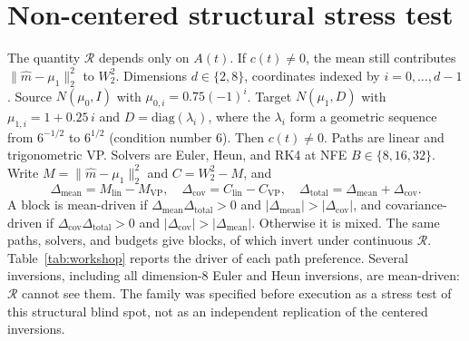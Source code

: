 \documentclass[11pt,a4paper]{article}
\theoremstyle{remark}
\newcommand{\wtwo}{W_2}
\newcommand{\cR}{\mathcal{R}}
\begin{document}
\begin{table}[!htbp]
  \centering
  \caption{Four specified candidate paths on the centered grid. Among
  these four paths, the per-mode schedule has the smallest $\cR$ and the
  smallest $\wtwo$ in $36$ of $36$ tested blocks. This finite enumeration
  does not imply that a global $\cR$-minimizer minimizes fixed-NFE error.
  When $\Sigma_1$ has at least two distinct eigenvalues, that path is not
  a Class~S shared interpolant.}
  \label{tab:logcov}
  \scriptsize
  \setlength{\tabcolsep}{3.5pt}
  
  \vspace{0.6em}
  \caption{Shared-schedule pairwise inversions: trigonometric VP versus
  Chen Example~3.3 with $M=\lambda_{\max}$. Nine of $36$ blocks; four of
  $12$ cells. Post-hoc pairwise census, not a global family optimum.}
  \label{tab:infamily}
  \small
  
\end{table}

\section{Non-centered structural stress test}
\label{app:noncentered}

The quantity $\cR$ depends only on $A(t)$. If $c(t)\ne 0$, the mean still
contributes $\|\hat m-\mu_1\|_2^2$ to $\wtwo^2$. Dimensions $d\in\{2,8\}$,
coordinates indexed by $i=0,\ldots,d-1$. Source $N(\mu_0,I)$ with
$\mu_{0,i}=0.75(-1)^i$. Target $N(\mu_1,D)$ with $\mu_{1,i}=1+0.25\,i$ and
$D=\mathrm{diag}(\lambda_i)$, where the $\lambda_i$ form a geometric
sequence from $6^{-1/2}$ to $6^{1/2}$ (condition number $6$). Then
$c(t)\ne 0$. Paths are linear and trigonometric VP. Solvers are Euler, Heun,
and RK4 at NFE $B\in\{8,16,32\}$. Write $M=\|\hat m-\mu_1\|_2^2$ and
$C=\wtwo^2-M$, and
\begin{equation}
  \Delta_{\mathrm{mean}}=M_{\mathrm{lin}}-M_{\mathrm{VP}},\quad
  \Delta_{\mathrm{cov}}=C_{\mathrm{lin}}-C_{\mathrm{VP}},\quad
  \Delta_{\mathrm{total}}=\Delta_{\mathrm{mean}}+\Delta_{\mathrm{cov}}.
\end{equation}
A block is mean-driven if $\Delta_{\mathrm{mean}}\Delta_{\mathrm{total}}>0$
and $|\Delta_{\mathrm{mean}}|>|\Delta_{\mathrm{cov}}|$, and
covariance-driven if $\Delta_{\mathrm{cov}}\Delta_{\mathrm{total}}>0$ and
$|\Delta_{\mathrm{cov}}|>|\Delta_{\mathrm{mean}}|$. Otherwise it is mixed.
The same paths, solvers, and budgets give \nWorkshopBlocks{} blocks, of
which \nWorkshopInversions{} invert under continuous $\cR$.
Table~\ref{tab:workshop} reports the driver of each path preference.
Several inversions, including all dimension-$8$ Euler and Heun inversions,
are mean-driven: $\cR$ cannot see them. The family was specified before
execution as a stress test of this structural blind spot, not as an
independent replication of the centered inversions.
\end{document}
